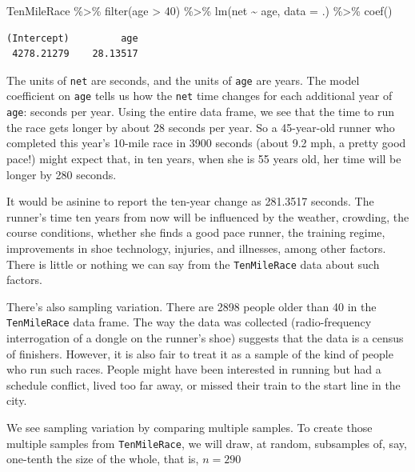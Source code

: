 \documentclass[
  letterpaper,
  DIV=11,
  numbers=noendperiod,
  oneside]{scrreprt}
\newenvironment{Shaded}{\begin{snugshade}}{\end{snugshade}}
\newcommand{\AttributeTok}[1]{\textcolor[rgb]{0.40,0.45,0.13}{#1}}
\newcommand{\DecValTok}[1]{\textcolor[rgb]{0.68,0.00,0.00}{#1}}
\newcommand{\FunctionTok}[1]{\textcolor[rgb]{0.28,0.35,0.67}{#1}}
\newcommand{\NormalTok}[1]{\textcolor[rgb]{0.00,0.23,0.31}{#1}}
\newcommand{\SpecialCharTok}[1]{\textcolor[rgb]{0.37,0.37,0.37}{#1}}
\begin{document}
\begin{Shaded}
\begin{Highlighting}[]
\NormalTok{TenMileRace }\SpecialCharTok{\%\textgreater{}\%} \FunctionTok{filter}\NormalTok{(age }\SpecialCharTok{\textgreater{}} \DecValTok{40}\NormalTok{) }\SpecialCharTok{\%\textgreater{}\%}
  \FunctionTok{lm}\NormalTok{(net }\SpecialCharTok{\textasciitilde{}}\NormalTok{ age, }\AttributeTok{data =}\NormalTok{ .) }\SpecialCharTok{\%\textgreater{}\%} \FunctionTok{coef}\NormalTok{()}
\end{Highlighting}
\end{Shaded}

\begin{verbatim}
(Intercept)         age 
 4278.21279    28.13517 
\end{verbatim}

The units of \texttt{net} are seconds, and the units of \texttt{age} are
years. The model coefficient on \texttt{age} tells us how the
\texttt{net} time changes for each additional year of \texttt{age}:
seconds per year. Using the entire data frame, we see that the time to
run the race gets longer by about 28 seconds per year. So a 45-year-old
runner who completed this year's 10-mile race in 3900 seconds (about 9.2
mph, a pretty good pace!) might expect that, in ten years, when she is
55 years old, her time will be longer by 280 seconds.

It would be asinine to report the ten-year change as 281.3517 seconds.
The runner's time ten years from now will be influenced by the weather,
crowding, the course conditions, whether she finds a good pace runner,
the training regime, improvements in shoe technology, injuries, and
illnesses, among other factors. There is little or nothing we can say
from the \texttt{TenMileRace} data about such factors.

There's also sampling variation. There are 2898 people older than 40 in
the \texttt{TenMileRace} data frame. The way the data was collected
(radio-frequency interrogation of a dongle on the runner's shoe)
suggests that the data is a census of finishers. However, it is also
fair to treat it as a sample of the kind of people who run such races.
People might have been interested in running but had a schedule
conflict, lived too far away, or missed their train to the start line in
the city.

We see sampling variation by comparing multiple samples. To create those
multiple samples from \texttt{TenMileRace}, we will draw, at random,
subsamples of, say, one-tenth the size of the whole, that is, \(n=290\)
\end{document}
